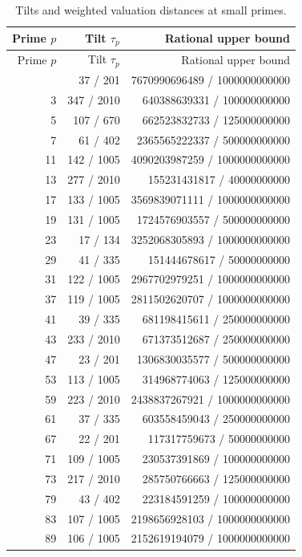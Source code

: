 \documentclass[11pt,a4paper]{article}
\begin{document}
\begingroup\small
\begin{longtable}{@{}rrr@{}}
\caption{Tilts and weighted valuation distances at small primes.}
\label{tab:small}\\
\toprule
Prime \(p\) & Tilt \(\tau_p\) & Rational upper bound\\
\midrule
\endfirsthead
\toprule
Prime \(p\) & Tilt \(\tau_p\) & Rational upper bound\\
\midrule
\endhead
\bottomrule
\endfoot
2 & 37 / 201 & 7670990696489 / 1000000000000 \\
3 & 347 / 2010 & 640388639331 / 100000000000 \\
5 & 107 / 670 & 662523832733 / 125000000000 \\
7 & 61 / 402 & 2365565222337 / 500000000000 \\
11 & 142 / 1005 & 4090203987259 / 1000000000000 \\
13 & 277 / 2010 & 155231431817 / 40000000000 \\
17 & 133 / 1005 & 3569839071111 / 1000000000000 \\
19 & 131 / 1005 & 1724576903557 / 500000000000 \\
23 & 17 / 134 & 3252068305893 / 1000000000000 \\
29 & 41 / 335 & 151444678617 / 50000000000 \\
31 & 122 / 1005 & 2967702979251 / 1000000000000 \\
37 & 119 / 1005 & 2811502620707 / 1000000000000 \\
41 & 39 / 335 & 681198415611 / 250000000000 \\
43 & 233 / 2010 & 671373512687 / 250000000000 \\
47 & 23 / 201 & 1306830035577 / 500000000000 \\
53 & 113 / 1005 & 314968774063 / 125000000000 \\
59 & 223 / 2010 & 2438837267921 / 1000000000000 \\
61 & 37 / 335 & 603558459043 / 250000000000 \\
67 & 22 / 201 & 117317759673 / 50000000000 \\
71 & 109 / 1005 & 230537391869 / 100000000000 \\
73 & 217 / 2010 & 285750766663 / 125000000000 \\
79 & 43 / 402 & 223184591259 / 100000000000 \\
83 & 107 / 1005 & 2198656928103 / 1000000000000 \\
89 & 106 / 1005 & 2152619194079 / 1000000000000 \\

\end{longtable}
\end{document}
